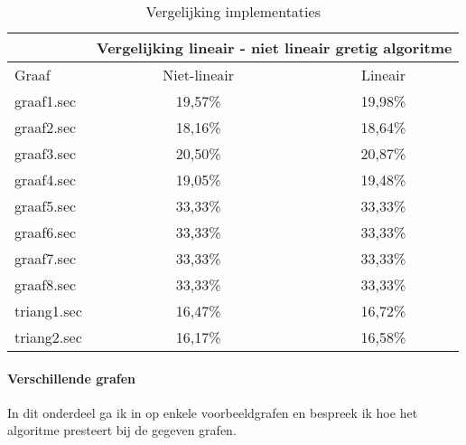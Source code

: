 \documentclass[11pt, a4paper, table]{article}
\theoremstyle{definition}
\theoremstyle{definition}
\theoremstyle{definition}
\begin{document}
\begin{table}
	\centering
	\begin{tabular}{|l|c|c|}
		\hline
		& \multicolumn{2}{c|}{Vergelijking lineair - niet lineair gretig algoritme}		\\ \hline
		Graaf & Niet-lineair  & Lineair 		\\ \hline
		graaf1.sec &  \cellcolor{LimeGreen}19,57\% & 19,98\%		\\ \hline
		graaf2.sec &  \cellcolor{LimeGreen}18,16\% & 18,64\%		\\ \hline
		graaf3.sec &  \cellcolor{LimeGreen}20,50\% & 20,87\%		\\ \hline
		graaf4.sec &  \cellcolor{LimeGreen}19,05\% & 19,48\%		\\ \hline
		graaf5.sec &  \cellcolor{LimeGreen}33,33\% & 33,33\%		\\ \hline
		graaf6.sec &  \cellcolor{LimeGreen}33,33\% & 33,33\%		\\ \hline
		graaf7.sec &  \cellcolor{LimeGreen}33,33\% & 33,33\%		\\ \hline
		graaf8.sec &  \cellcolor{LimeGreen}33,33\% & 33,33\%		\\ \hline
		triang1.sec &  \cellcolor{LimeGreen}16,47\% & 16,72\%		\\ \hline
		triang2.sec &  \cellcolor{LimeGreen}16,17\% & 16,58\%		\\ \hline
	\end{tabular}
	\caption{Vergelijking implementaties}
	\label{tabel:nonlinear}
\end{table}

\paragraph{Verschillende grafen}
In dit onderdeel ga ik in op enkele voorbeeldgrafen en bespreek ik hoe het algoritme presteert bij de gegeven grafen. 
\end{document}
